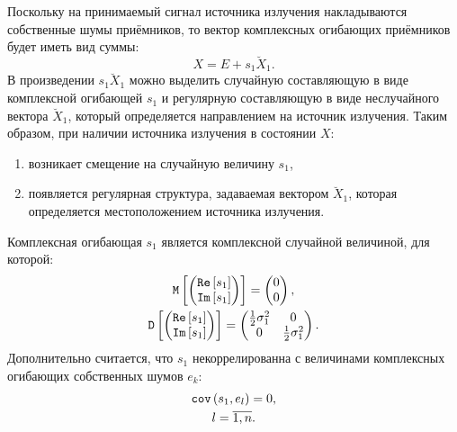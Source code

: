 Поскольку на принимаемый сигнал источника излучения накладываются собственные шумы приёмников, то вектор комплексных огибающих приёмников будет иметь вид суммы:
\begin{equation}
    \label{jammers:single:state}
    X = E + s_1 \breve{X}_1 .
\end{equation}
В произведении $s_1 \breve{X}_1$ можно выделить случайную составляющую в виде комплексной огибающей $s_1$ и регулярную составляющую в виде неслучайного вектора
$\breve{X}_1$, который определяется направлением на источник излучения. Таким образом, при наличии источника излучения в состоянии $X$:
\begin{enumerate}
    \item возникает смещение на случайную величину $s_1$,
    \item появляется регулярная структура, задаваемая вектором $\breve{X}_1$, которая определяется местоположением источника излучения.
\end{enumerate}
Комплексная огибающая $s_1$ является комплексной случайной величиной, для которой:
\begin{gather*}
    \mathtt{M} \left [ 
        \begin{pmatrix}
            \mathtt{Re} \left [ s_1 \right ] \\ \mathtt{Im} \left [ s_1 \right ]
        \end{pmatrix}
     \right ] =
    \begin{pmatrix}
        0 \\
        0
    \end{pmatrix} , \\
    \mathtt{D} \left [ 
        \begin{pmatrix}
            \mathtt{Re} \left [ s_1 \right ] \\ \mathtt{Im} \left [ s_1 \right ]
        \end{pmatrix}
     \right ] =
    \begin{pmatrix}
        \frac{1}{2} \sigma_1^2 & 0                      \\
        0                      & \frac{1}{2} \sigma_1^2
    \end{pmatrix} .
\end{gather*}
Дополнительно считается, что $s_1$ некоррелированна с величинами комплексных огибающих собственных шумов $e_k$:
\begin{gather*}
    \mathtt{cov} \left ( s_1, e_l \right ) = 0 , \\
    l = \overline{1, n}.
\end{gather*}

